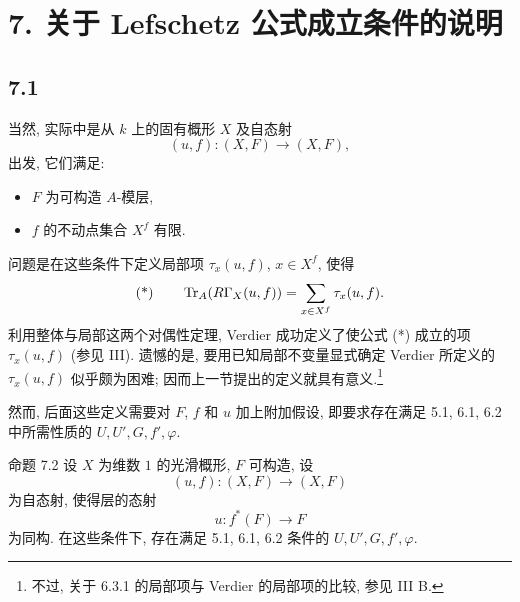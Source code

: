 \section*{7. 关于 Lefschetz 公式成立条件的说明}

\subsection*{7.1}
当然, 实际中是从 $k$ 上的固有概形 $X$ 及自态射
\[
(u,f):(X,F)\longrightarrow (X,F),
\]
出发, 它们满足:
\begin{itemize}
\item $F$ 为可构造 $A$-模层,
\item $f$ 的不动点集合 $X^f$ 有限.
\end{itemize}
问题是在这些条件下定义局部项 $\tau_x(u,f)$, $x\in X^f$, 使得
\[
\text{(*)}\qquad \operatorname{Tr}_A(R\Gamma_X(u,f))=\sum_{x\in X^f}\tau_x(u,f).
\]
利用整体与局部这两个对偶性定理, Verdier 成功定义了使公式 (*) 成立的项 $\tau_x(u,f)$ (参见 III). 遗憾的是, 要用已知局部不变量显式确定 Verdier 所定义的 $\tau_x(u,f)$ 似乎颇为困难; 因而上一节提出的定义就具有意义.\footnote{不过, 关于 6.3.1 的局部项与 Verdier 的局部项的比较, 参见 III B.}

然而, 后面这些定义需要对 $F$, $f$ 和 $u$ 加上附加假设, 即要求存在满足 5.1, 6.1, 6.2 中所需性质的 $U,U',G,f',\varphi$.

\begin{statement}{命题 7.2}
设 $X$ 为维数 $1$ 的光滑概形, $F$ 可构造, 设
\[
(u,f):(X,F)\longrightarrow (X,F)
\]
为自态射, 使得层的态射
\[
u:f^*(F)\longrightarrow F
\]
为同构. 在这些条件下, 存在满足 5.1, 6.1, 6.2 条件的 $U,U',G,f',\varphi$.
\end{statement}

